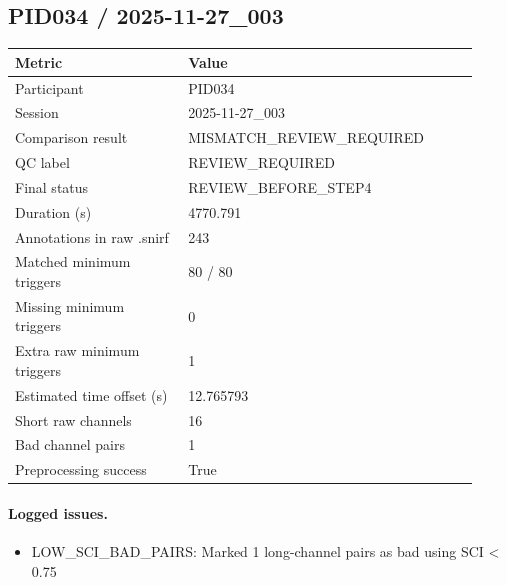 \subsection*{PID034 / 2025-11-27\_003}
\begin{tabular}{p{0.34\linewidth}p{0.58\linewidth}}
\toprule
Metric & Value\\
\midrule
Participant & PID034\\
Session & 2025-11-27\_003\\
Comparison result & MISMATCH\_REVIEW\_REQUIRED\\
QC label & REVIEW\_REQUIRED\\
Final status & REVIEW\_BEFORE\_STEP4\\
Duration (s) & 4770.791\\
Annotations in raw .snirf & 243\\
Matched minimum triggers & 80 / 80\\
Missing minimum triggers & 0\\
Extra raw minimum triggers & 1\\
Estimated time offset (s) & 12.765793\\
Short raw channels & 16\\
Bad channel pairs & 1\\
Preprocessing success & True\\
\bottomrule
\end{tabular}
\paragraph{Logged issues.}
\begin{itemize}
\item [WARNING] LOW\_SCI\_BAD\_PAIRS: Marked 1 long-channel pairs as bad using SCI < 0.75
\end{itemize}
